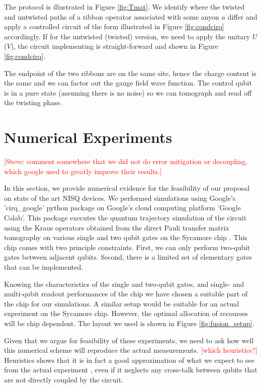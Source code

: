 \documentclass[two column]{article}
\newcommand{\caro}[1]{\textcolor{red}{[#1]}}
\begin{document}
The protocol is illustrated in Figure \ref{fig:Tmat}. We identify where the twisted and untwisted paths of a ribbon operator associated with some anyon $a$ differ and apply a controlled circuit of the form illustrated in Figure \ref{fig:condcirq} accordingly. If for the untwisted (twisted) version, we need to apply the unitary $U$ ($V$), the circuit implementing is straight-forward and shown in Figure \ref{fig:condcirq}.

The endpoint of the two ribbons are on the same site, hence the charge content is the same and we can factor out the gauge field wave function. 
The control qubit is in a pure state (assuming there is no noise) so we can tomograph and read off the twisting phase.


\section{Numerical Experiments}\label{sec:num}
\caro{Steve: comment somewhere that we did not do error mitigation or decoupling, which google used to greatly improve their results.}

In this section, we provide numerical evidence for the feasibility of our proposal on state of the art NISQ devices. We performed simulations using Google's 'cirq\_google' python package on Google's cloud computing platform 'Google Colab'. This package executes the quantum trajectory simulation of the circuit using the Kraus operators obtained from the direct Pauli transfer matrix tomography on various single and two qubit gates on the Sycamore chip \cite{weber}. This chip comes with two principle constraints. First, we can only perform two-qubit gates between adjacent qubits. Second, there is a limited set of elementary gates that can be implemented. 


Knowing the characteristics of the single and two-qubit gates, and single- and multi-qubit readout performances of the chip \cite{weber} we have chosen a suitable part of the chip for our simulations. A similar setup would be suitable for an actual experiment on the Sycamore chip. However, the optimal allocation of recourses will be chip dependent. The layout we used is shown in Figure \ref{fig:fusion_setup}.

Given that we argue for feasibility of these experiments, we need to ask how well this numerical scheme will reproduce the actual measurements.
\caro{which heuristics?} Heuristics shows that it is in fact a good approximation of what we expect to see from the actual experiment \cite{}, even if it neglects any cross-talk between qubits that are not directly coupled by the circuit.
\end{document}
